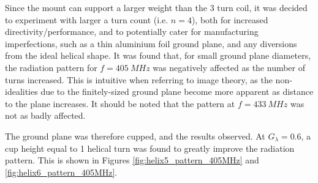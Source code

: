 Since the mount can support a larger weight than the 3 turn coil, it was decided to experiment with larger a turn count (i.e. $n=4$), both for increased directivity/performance, and to potentially cater for manufacturing imperfections, such as a thin aluminium foil ground plane, and any diversions from the ideal helical shape. It was found that, for small ground plane diameters, the radiation pattern for $f = \SI{405}{MHz}$ was negatively affected as the number of turns increased. This is intuitive when referring to image theory, as the non-idealities due to the finitely-sized ground plane become more apparent as distance to the plane increases. It should be noted that the pattern at $f = \SI{433}{MHz}$ was not as badly affected.

The ground plane was therefore cupped, and the results observed. At $G_\lambda = 0.6$, a cup height equal to 1 helical turn was found to greatly improve the radiation pattern. This is shown in Figures \ref{fig:helix5_pattern_405MHz} and \ref{fig:helix6_pattern_405MHz}.

